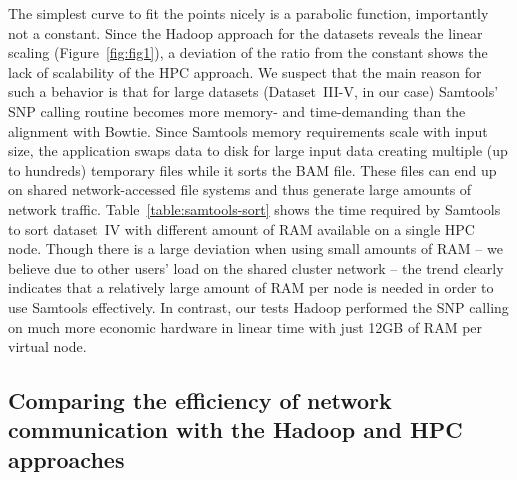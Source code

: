 \documentclass[10pt]{article}
\newcommand{\Fixme}[1]{{\color{FixmeColor}{#1}}}
\newcommand{\COMMENT}[1]{{\color{red} #1 }}
\begin{document}
The simplest curve to fit the points nicely is a parabolic function, importantly not a constant. 
Since the Hadoop approach for the datasets reveals the linear scaling (Figure~\ref{fig:fig1}), a deviation of the ratio from the constant shows the 
lack of scalability of the HPC approach.
We suspect that the main reason for such a behavior is that for large datasets
(Dataset~III-V, in our case) Samtools' SNP calling routine becomes more memory-
and time-demanding than the alignment with Bowtie.  Since Samtools memory
requirements scale with input size, the application swaps
data to disk for large input data creating multiple (up to hundreds) temporary files while it sorts
the BAM file. These files can end up on shared network-accessed
file systems and thus generate large amounts of network traffic.
Table~\ref{table:samtools-sort} shows the time required by Samtools to sort dataset~IV with
different amount of RAM available on a single HPC node. Though there is a large
deviation when using small amounts of RAM -- we believe due to other users' load
on the shared cluster network -- the trend clearly indicates that a relatively
large amount of RAM per node is needed in order to use Samtools effectively. In
contrast, our tests Hadoop performed the SNP calling on much more economic
hardware in linear time with just 12GB of RAM per virtual node.




\subsection*{Comparing the efficiency of network communication with the Hadoop and HPC approaches}
\Fixme{New heading propsal: Efficiency of network communication}
\end{document}
